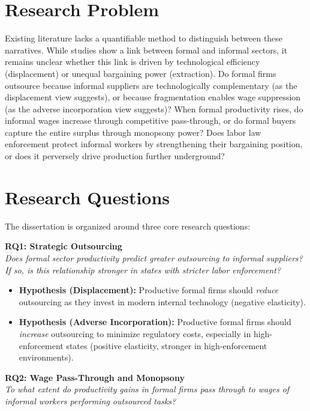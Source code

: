 \section {Research Problem}


Existing literature lacks a quantifiable method to distinguish between these narratives. While studies show a link between formal and informal sectors, it remains unclear whether this link is driven by technological efficiency (displacement) or unequal bargaining power (extraction). Do formal firms outsource because informal suppliers are technologically complementary (as the displacement view suggests), or because fragmentation enables wage suppression (as the adverse incorporation view suggests)? When formal productivity rises, do informal wages increase through competitive pass-through, or do formal buyers capture the entire surplus through monopsony power? Does labor law enforcement protect informal workers by strengthening their bargaining position, or does it perversely drive production further underground?


\section{Research Questions}

The dissertation is organized around three core research questions:

\textbf{RQ1: Strategic Outsourcing}\\
\emph{Does formal sector productivity predict greater outsourcing to informal suppliers? If so, is this relationship stronger in states with stricter labor enforcement?}

\begin{itemize}
	\item \textbf{Hypothesis (Displacement):} Productive formal firms should \textit{reduce} outsourcing as they invest in modern internal technology (negative elasticity).
	\item \textbf{Hypothesis (Adverse Incorporation):} Productive formal firms should \textit{increase} outsourcing to minimize regulatory costs, especially in high-enforcement states (positive elasticity, stronger in high-enforcement environments).
\end{itemize}

\textbf{RQ2: Wage Pass-Through and Monopsony}\\
\emph{To what extent do productivity gains in formal firms pass through to wages of informal workers performing outsourced tasks?}

